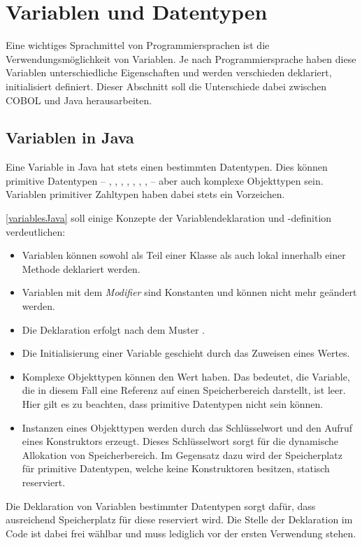 \section{Variablen und Datentypen} \label{variables} \label{sec:scope}
Eine wichtiges Sprachmittel von Programmiersprachen ist die Verwendungsmöglichkeit von Variablen. Je nach Programmiersprache haben diese Variablen unterschiedliche Eigenschaften und werden verschieden deklariert, initialisiert \bzw definiert. Dieser Abschnitt soll die Unterschiede dabei zwischen COBOL und Java herausarbeiten.

\subsection*{Variablen in Java}
Eine Variable in Java hat stets einen bestimmten Datentypen. Dies können primitive Datentypen -- , , , , , , ,  -- aber auch komplexe Objekttypen sein. Variablen primitiver Zahltypen haben dabei stets ein Vorzeichen.


\autoref{variablesJava} soll einige Konzepte der Variablendeklaration und -definition verdeutlichen:
\begin{itemize}
 \item Variablen können sowohl als Teil einer Klasse als auch lokal innerhalb einer Methode deklariert werden. 
 \item Variablen mit dem \textit{Modifier}  sind Konstanten und können nicht mehr geändert werden.
 \item Die Deklaration erfolgt nach dem Muster .
 \item Die Initialisierung einer Variable geschieht durch das Zuweisen eines Wertes.
 \item Komplexe Objekttypen können den Wert  haben. Das bedeutet, die Variable, die in diesem Fall eine Referenz auf einen Speicherbereich darstellt, ist leer. Hier gilt es zu beachten, dass primitive Datentypen nicht  sein können. 
 \item Instanzen eines Objekttypen werden durch das Schlüsselwort  und den Aufruf eines Konstruktors erzeugt. Dieses Schlüsselwort sorgt für die dynamische Allokation von Speicherbereich. Im Gegensatz dazu wird der Speicherplatz für primitive Datentypen, welche keine Konstruktoren besitzen, statisch reserviert.
\end{itemize}
Die Deklaration von Variablen bestimmter Datentypen sorgt dafür, dass ausreichend Speicherplatz für diese reserviert wird. Die Stelle der Deklaration im Code ist dabei frei wählbar und muss lediglich vor der ersten Verwendung stehen. 

